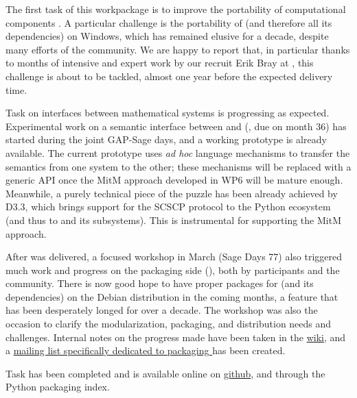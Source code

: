 \documentclass{deliverablereport}
\begin{document}
The first task of this workpackage is to improve the portability of
computational components
. A particular challenge
is the portability of \Sage (and therefore all its dependencies)
on Windows, which has remained elusive for a decade, despite many
efforts of the community. We are happy to report that, in particular
thanks to months of intensive and expert work by our recruit Erik Bray at 
, this challenge is about to be tackled, almost one year
before the expected delivery time.

Task  on interfaces
between mathematical systems is progressing as expected. Experimental
work on a semantic interface between \GAP and \Sage
(, due
on month 36) has started during the joint GAP-Sage days, and a working
prototype is already available. The current prototype uses \emph{ad
  hoc} language mechanisms to transfer the semantics from one system
to the other; these mechanisms will be replaced with a generic API
once the MitM approach developed in WP6 will be mature
enough. Meanwhile, a purely technical piece of the puzzle has been
already achieved by D3.3, which brings support for the SCSCP protocol
to the Python ecosystem (and thus to \Sage and its subsystems). This
is instrumental for supporting the MitM approach.

After  was delivered, a focused workshop
 in March (Sage Days 77) also triggered much work
and progress on the packaging side
(), both by \ODK
participants and the community. There is now good hope to have proper
packages for \Sage (and its dependencies) on the Debian
distribution in the coming months, a feature that has been desperately
longed for over a decade.  The workshop was also the occasion to
clarify the modularization, packaging, and distribution needs and
challenges. Internal notes on the progress made have been taken in the
\href{https://wiki.sagemath.org/days77/packaging}{\Sage wiki}, and a
\href{https://groups.google.com/forum/#!forum/sage-packaging}{mailing
  list specifically dedicated to packaging \Sage} has been created.

Task  has
been completed and is available online on
\href{https://github.com/joommf/oommfc}{github}, and through the
Python packaging index.
\end{document}
